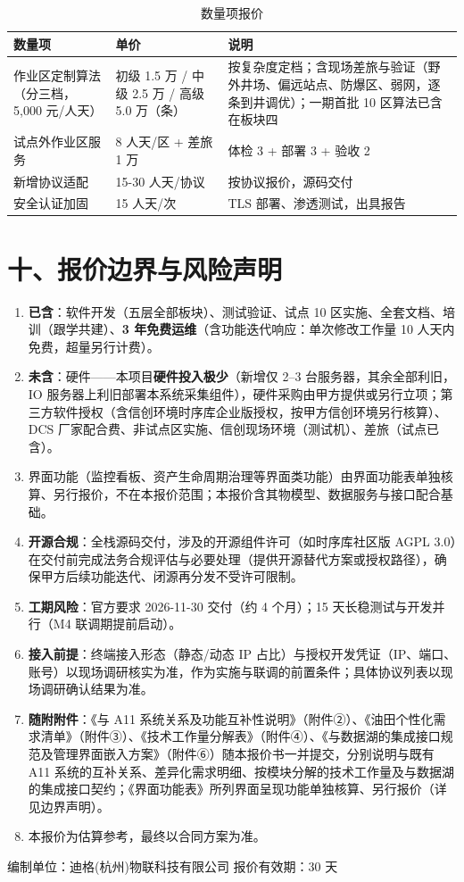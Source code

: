 \documentclass[11pt,a4paper]{ctexart}
\begin{document}
\begin{table}[H]\centering
\caption{数量项报价}
\begin{tabular}{p{3.8cm} p{3.2cm} p{6.5cm}}
\toprule
\textbf{数量项} & \textbf{单价} & \textbf{说明} \\
\midrule
作业区定制算法（分三档，5,000 元/人天） & 初级 1.5 万 / 中级 2.5 万 / 高级 5.0 万（条） & 按复杂度定档；含现场差旅与验证（野外井场、偏远站点、防爆区、弱网，逐条到井调优）；一期首批 10 区算法已含在板块四 \\
试点外作业区服务 & 8 人天/区 + 差旅 1 万 & 体检 3 + 部署 3 + 验收 2 \\
新增协议适配 & 15-30 人天/协议 & 按协议报价，源码交付 \\
安全认证加固 & 15 人天/次 & TLS 部署、渗透测试，出具报告 \\
\bottomrule
\end{tabular}
\end{table}

\section{十、报价边界与风险声明}

\begin{enumerate}[leftmargin=*]
  \item \textbf{已含}：软件开发（五层全部板块）、测试验证、试点 10 区实施、全套文档、培训（跟学共建）、\textbf{3 年免费运维}（含功能迭代响应：单次修改工作量 10 人天内免费，超量另行计费）。
  \item \textbf{未含}：硬件——本项目\textbf{硬件投入极少}（新增仅 2--3 台服务器，其余全部利旧，IO 服务器上利旧部署本系统采集组件），硬件采购由甲方提供或另行立项；第三方软件授权（含信创环境时序库企业版授权，按甲方信创环境另行核算）、DCS 厂家配合费、非试点区实施、信创现场环境（测试机）、差旅（试点已含）。
  \item 界面功能（监控看板、资产生命周期治理等界面类功能）由界面功能表单独核算、另行报价，不在本报价范围；本报价含其物模型、数据服务与接口配合基础。
  \item \textbf{开源合规}：全栈源码交付，涉及的开源组件许可（如时序库社区版 AGPL 3.0）在交付前完成法务合规评估与必要处理（提供开源替代方案或授权路径），确保甲方后续功能迭代、闭源再分发不受许可限制。
  \item \textbf{工期风险}：官方要求 2026-11-30 交付（约 4 个月）；15 天长稳测试与开发并行（M4 联调期提前启动）。
  \item \textbf{接入前提}：终端接入形态（静态/动态 IP 占比）与授权开发凭证（IP、端口、账号）以现场调研核实为准，作为实施与联调的前置条件；具体协议列表以现场调研确认结果为准。
  \item \textbf{随附附件}：《与 A11 系统关系及功能互补性说明》（附件②）、《油田个性化需求清单》（附件③）、《技术工作量分解表》（附件④）、《与数据湖的集成接口规范及管理界面嵌入方案》（附件⑥）随本报价书一并提交，分别说明与既有 A11 系统的互补关系、差异化需求明细、按模块分解的技术工作量及与数据湖的集成接口契约；《界面功能表》所列界面呈现功能单独核算、另行报价（详见边界声明）。
  \item 本报价为估算参考，最终以合同方案为准。
\end{enumerate}

\vspace{2em}
\noindent\hrulefill
\vspace{1em}

\begin{center}
\small 编制单位：迪格(杭州)物联科技有限公司 \quad 报价有效期：30 天
\end{center}
\end{document}
